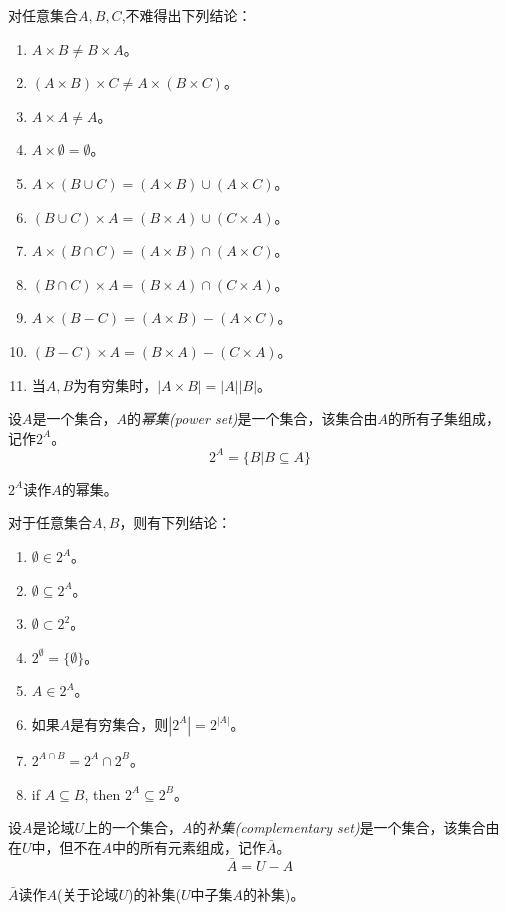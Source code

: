对任意集合$A,B,C$,不难得出下列结论：
\begin{enumerate}
	\item $A\times B\ne B\times A$。
	\item $(A\times B)\times C\ne A\times(B\times C)$。
	\item $A\times A\ne A$。
	\item $A\times\emptyset=\emptyset$。
	\item $A\times(B\cup C)=(A\times B)\cup(A\times C)$。
	\item $(B\cup C)\times A=(B\times A)\cup(C\times A)$。
	\item $A\times(B\cap C)=(A\times B)\cap(A\times C)$。
	\item $(B\cap C)\times A=(B\times A)\cap(C\times A)$。
	\item $A\times(B-C)=(A\times B)-(A\times C)$。
	\item $(B-C)\times A=(B\times A)-(C\times A)$。
	\item 当$A,B$为有穷集时，$|A\times B|=|A||B|$。
\end{enumerate} 

\begin{definition}
	设$A$是一个集合，$A$的\emph{幂集(power set)}是一个集合，该集合由$A$的所有子集组成，记作$2^A$。
	$$2^A=\{B|B\subseteq A\}$$
\end{definition}
$2^A$读作$A$的幂集。

对于任意集合$A,B$，则有下列结论：
\begin{enumerate}
	\item $\emptyset\in 2^A$。
	\item $\emptyset\subseteq 2^A$。
	\item $\emptyset\subset 2^2$。
	\item $2^\emptyset=\{\emptyset\}$。
	\item $A\in 2^A$。
	\item 如果$A$是有穷集合，则$|2^A|=2^|A|$。
	\item $2^{A\cap B} = 2^A\cap 2^B$。
	\item if $A\subseteq B$, then $2^A\subseteq 2^B$。
\end{enumerate}


\begin{definition}
	设$A$是论域$U$上的一个集合，$A$的\emph{补集(complementary set)}是一个集合，该集合由在$U$中，但不在$A$中的所有元素组成，记作$\bar{A}$。
	$$\bar{A}=U-A$$
\end{definition}
$\bar{A}$读作$A$(关于论域$U$)的补集($U$中子集$A$的补集)。

